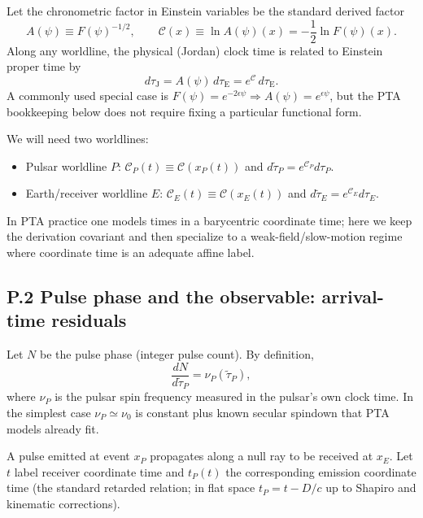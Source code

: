\documentclass[10pt]{article}
\newcommand{\Fpsi}{F(\psi)}
\newcommand{\Apsi}{A(\psi)}
\newcommand{\Eclk}{E}
\begin{document}
Let the chronometric factor in Einstein variables be the standard derived factor
\begin{equation}
\Apsi \equiv \Fpsi^{-1/2},
\qquad
\mathcal{C}(x)\equiv \ln \Apsi(x) = -\frac12\ln \Fpsi(x).
\label{eq:P_C_def}
\end{equation}
Along any worldline, the physical (Jordan) clock time is related to Einstein proper time by
\begin{equation}
d\tau_{\mathrm{J}} = \Apsi\,d\tau_{\mathrm{E}} = e^{\mathcal{C}}\,d\tau_{\mathrm{E}}.
\label{eq:P_tau_relation}
\end{equation}
A commonly used special case is \(F(\psi)=e^{-2\epsilon\psi}\Rightarrow \Apsi=e^{\epsilon\psi}\), but
the PTA bookkeeping below does not require fixing a particular functional form.

We will need two worldlines:
\begin{itemize}[leftmargin=1.2em]
\item Pulsar worldline $P$: $\mathcal{C}_P(t)\equiv \mathcal{C}(x_P(t))$ and $d\tilde\tau_P = e^{\mathcal{C}_P}d\tau_P$.
\item Earth/receiver worldline $\Eclk$: $\mathcal{C}_{\Eclk}(t)\equiv \mathcal{C}(x_{\Eclk}(t))$ and $d\tilde\tau_{\Eclk} = e^{\mathcal{C}_{\Eclk}}d\tau_{\Eclk}$.
\end{itemize}

In PTA practice one models times in a barycentric coordinate time; here we keep the derivation
covariant and then specialize to a weak-field/slow-motion regime where coordinate time is an
adequate affine label.

\subsection{P.2 Pulse phase and the observable: arrival-time residuals}
\label{app:pta:phase_toa}

Let $N$ be the pulse phase (integer pulse count). By definition,
\begin{equation}
\frac{dN}{d\tilde\tau_P}=\nu_P(\tilde\tau_P),
\label{eq:P_phase_def}
\end{equation}
where $\nu_P$ is the pulsar spin frequency measured in the pulsar's own clock time.
In the simplest case $\nu_P\simeq \nu_0$ is constant plus known secular spindown that PTA models already fit.

A pulse emitted at event $x_P$ propagates along a null ray to be received at $x_E$.
Let $t$ label receiver coordinate time and $t_P(t)$ the corresponding emission coordinate time
(the standard retarded relation; in flat space $t_P=t-D/c$ up to Shapiro and kinematic corrections).
\end{document}
